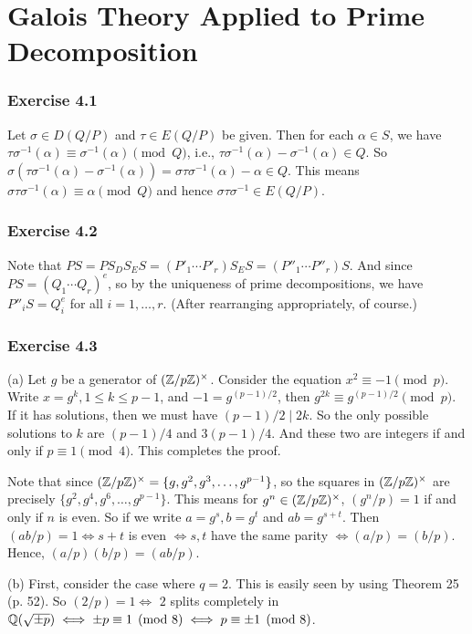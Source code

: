 \documentclass[../Marcus.tex]{subfiles}
\begin{document}
\chapter{Galois Theory Applied to Prime Decomposition}

\subsection*{Exercise 4.1}

Let $\sigma\in D(Q/P)$ and $\tau\in E(Q/P)$ be given. Then for each $\alpha\in S$, we have $\tau\sigma^{-1}(\alpha)\equiv \sigma^{-1}(\alpha) \pmod{Q}$, i.e., $\tau\sigma^{-1}(\alpha)-\sigma^{-1}(\alpha)\in Q$. So $\sigma(\tau\sigma^{-1}(\alpha)-\sigma^{-1}(\alpha))=\sigma\tau\sigma^{-1}(\alpha)-\alpha \in Q$. This means $\sigma\tau\sigma^{-1}(\alpha) \equiv \alpha \pmod{Q}$ and hence $\sigma\tau\sigma^{-1}\in E(Q/P)$.

\subsection*{Exercise 4.2}

Note that $PS=PS_DS_ES=(P'_1\cdots P'_r)S_ES=(P''_1\cdots P''_r)S$. And since $PS=(Q_1\cdots Q_r)^e$, so by the uniqueness of prime decompositions, we have $P''_iS=Q_i^e$ for all $i=1,\ldots,r$. (After rearranging appropriately, of course.)

\subsection*{Exercise 4.3}

(a) Let $g$ be a generator of $(\mathbb{Z}/p\mathbb{Z})^\times$. Consider the equation $x^2\equiv -1\pmod{p}$. Write $x=g^k,1\leq k\leq p-1$, and $-1=g^{(p-1)/2}$, then $g^{2k}\equiv g^{(p-1)/2}\pmod{p}$. If it has solutions, then we must have $(p-1)/2\mid 2k$. So the only possible solutions to $k$ are $(p-1)/4$ and $3(p-1)/4$. And these two are integers if and only if $p\equiv 1\pmod{4}$. This completes the proof.

Note that since $(\mathbb{Z}/p\mathbb{Z})^\times=\{g,g^2,g^3,\ldots,g^{p-1}\}$, so the squares in $(\mathbb{Z}/p\mathbb{Z})^\times$ are precisely $\{g^2,g^4,g^6,\ldots,g^{p-1}\}$. This means for $g^n\in(\mathbb{Z}/p\mathbb{Z})^\times$, $(g^n/p)=1$ if and only if $n$ is even. So if we write $a=g^s,b=g^t$ and $ab=g^{s+t}$. Then $(ab/p)=1 \iff s+t$ is even $\iff s,t$ have the same parity $\iff (a/p)=(b/p)$. Hence, $(a/p)(b/p)=(ab/p)$.

(b) First, consider the case where $q=2$. This is easily seen by using Theorem 25 (p. 52). So $(2/p)=1 \iff$ $2$ splits completely in $\mathbb{Q}(\sqrt{\pm p}) \iff \pm p\equiv 1 \pmod{8} \iff p\equiv \pm1 \pmod{8}$.
\end{document}
